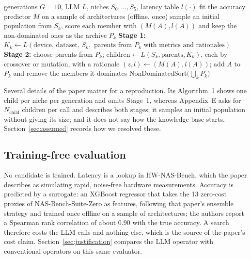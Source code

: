 \begin{algorithm}[t]
\caption{LLM-NAS, paraphrasing Algorithm~1 and Appendix~E of the paper.}\label{alg:llmnas}
\begin{algorithmic}[1]
\Require generations $G=10$, LLM $L$, niches $S_0,\dots,S_5$, latency table $l(\cdot)$
\State fit the accuracy predictor $M$ on a sample of architectures (offline, once)
  \State sample an initial population from $S_k$, score each member with $(M(A),l(A))$ and keep the non-dominated ones as the archive $P_k$
\EndFor
{}
    \State \textbf{Stage 1:} $K_k\gets L(\text{device, dataset, }S_k,\text{ parents from }P_k\text{ with metrics and rationales})$
    \State \textbf{Stage 2:} choose parents from $P_k$; $\text{children}\gets L(S_k,\text{parents},K_k)$, each by crossover or mutation, with a rationale
      \State $(z,l)\gets(M(A),l(A))$; add $A$ to $P_k$ and remove the members it dominates
    \EndFor
  \EndFor
\EndFor
\State \Return NonDominatedSort$\big(\bigcup_k P_k\big)$
\end{algorithmic}
\end{algorithm}

Several details of the paper matter for a reproduction. Its Algorithm~1 shows one child per niche per generation and omits Stage~1, whereas Appendix~E asks for $N_{\text{child}}$ children per call and describes both stages; it samples an initial population without giving its size; and it does not say how the knowledge base starts. Section~\ref{sec:assumed} records how we resolved these.

\subsection{Training-free evaluation}
No candidate is trained. Latency is a lookup in HW-NAS-Bench, which the paper describes as simulating rapid, noise-free hardware measurements. Accuracy is predicted by a surrogate: an XGBoost regressor that takes the 13 zero-cost proxies of NAS-Bench-Suite-Zero \cite{nbsz} as features, following that paper's ensemble strategy and trained once offline on a sample of architectures; the authors report a Spearman rank correlation of about 0.90 with the true accuracy. A search therefore costs the LLM calls and nothing else, which is the source of the paper's cost claim. Section~\ref{sec:justification} compares the LLM operator with conventional operators on this same evaluator.

